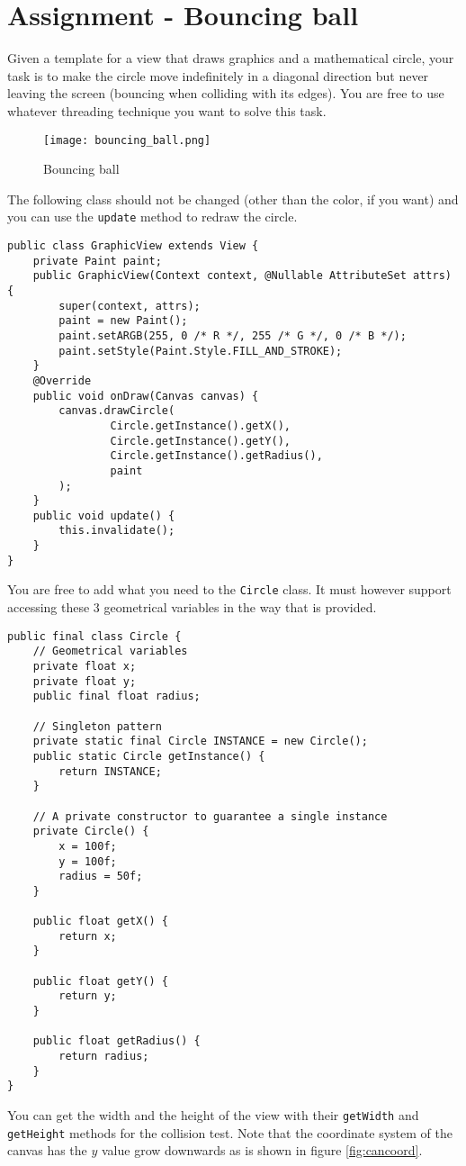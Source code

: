 \section{Assignment - Bouncing ball}
Given a template for a view that draws graphics and a mathematical circle, your task is to make the circle move indefinitely in a diagonal direction but never leaving the screen (bouncing when colliding with its edges). You are free to use whatever threading technique you want to solve this task.

\begin{figure}[H]
\centering
\texttt{[image: bouncing\_ball.png]}
\caption{Bouncing ball}
\label{fig:bball}
\end{figure}

The following class should not be changed (other than the color, if you want) and you can use the \texttt{update} method to redraw the circle.
\begin{lstlisting}[style=A_Java]
public class GraphicView extends View {
    private Paint paint;
    public GraphicView(Context context, @Nullable AttributeSet attrs) {
        super(context, attrs);
        paint = new Paint();
        paint.setARGB(255, 0 /* R */, 255 /* G */, 0 /* B */);
        paint.setStyle(Paint.Style.FILL_AND_STROKE);
    }
    @Override
    public void onDraw(Canvas canvas) {
        canvas.drawCircle(
                Circle.getInstance().getX(), 
                Circle.getInstance().getY(),
                Circle.getInstance().getRadius(), 
                paint
        );
    }
    public void update() {
        this.invalidate();
    }
}
\end{lstlisting}
You are free to add what you need to the \texttt{Circle} class. It must however support accessing these 3 geometrical variables in the way that is provided.
\begin{lstlisting}[style=A_Java]
public final class Circle {
    // Geometrical variables
    private float x;
    private float y;
    public final float radius;

    // Singleton pattern
    private static final Circle INSTANCE = new Circle();
    public static Circle getInstance() {
        return INSTANCE;
    }

    // A private constructor to guarantee a single instance
    private Circle() {
        x = 100f;
        y = 100f;
        radius = 50f;
    }

    public float getX() {
        return x;
    }

    public float getY() {
        return y;
    }

    public float getRadius() {
        return radius;
    }
}
\end{lstlisting}
You can get the width and the height of the view with their \texttt{getWidth} and \texttt{getHeight} methods for the collision test. Note that the coordinate system of the canvas has the $y$ value grow downwards as is shown in figure \ref{fig:cancoord}.

